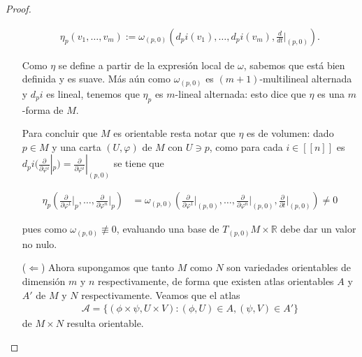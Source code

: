 \documentclass[11pt]{article}
\newcommand{\R}{\mathbb{R}}
\newcommand{\nat}[1]{[\![#1]\!]}
\begin{document}
\begin{proof}
\begin{itemize}[listparindent = \parindent]
\begin{align*}
\eta_p(v_1, \dots, v_m) := \omega_{(p,0)}\left(d_pi(v_1), \dots, d_pi(v_m), \frac{d}{dt}\Big|_{(p,0)}\right).
\end{align*}

Como $\eta$ se define a partir de la expresión local de $\omega$, sabemos que está bien definida y es suave. Más aún como $\omega_{(p,0)}$ es $(m+1)$-multilineal alternada y $d_pi$ es lineal, tenemos que $\eta_p$ es $m$-lineal alternada: esto dice que $\eta$ es una $m$-forma de $M$.

Para concluir que $M$ es orientable resta notar que $\eta$ es de volumen: dado $p \in M$ y una carta $(U,\varphi)$ de $M$ con $U \ni p$, como para cada $i \in \nat{n}$ es $d_pi(\frac{\partial}{\partial \varphi^i}|_p)  = \frac{\partial}{\partial \varphi^i}|_{(p,0)}$ se tiene que

\begin{align*}
\eta_p\left(\frac{\partial}{\partial \varphi^1}\Big|_p, \dots, \frac{\partial}{\partial \varphi^n}\Big|_p\right) &= \omega_{(p,0)}\left(\frac{\partial}{\partial \varphi^1}\Big|_{(p,0)}, \dots, \frac{\partial}{\partial \varphi^n}\Big|_{(p,0)}, \frac{\partial}{\partial t}\Big|_{(p,0)}\right) \neq 0
\end{align*}

pues como $\omega_{(p,0)} \not \equiv 0$, evaluando una base de $T_{(p,0)}M \times \R$ debe dar un valor no nulo.

\item[($\Leftarrow$)] Ahora supongamos que tanto $M$ como $N$ son variedades orientables de dimensión $m$ y $n$ respectivamente, de forma que existen atlas orientables $A$ y $A'$ de $M$ y $N$ respectivamente. Veamos que el atlas
\begin{align*}
\mathcal{A} = \{(\phi \times \psi, U \times V) : (\phi,U) \in A, (\psi,V)\in A'\}
\end{align*}
de $M \times N$ resulta orientable.


\end{itemize}
\end{proof}
\end{document}
